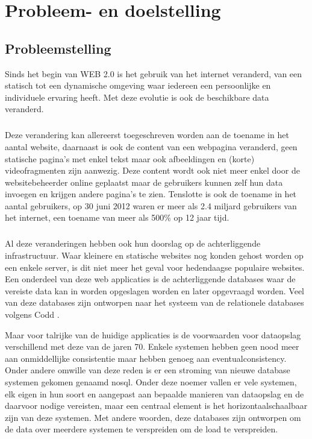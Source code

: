 \documentclass{book}
\begin{document}


\chapter{Probleem- en doelstelling}

\section{Probleemstelling}
Sinds het begin van WEB 2.0 is het gebruik van het internet veranderd, van een statisch tot een dynamische omgeving waar iedereen een persoonlijke en individuele ervaring heeft. Met deze evolutie is ook de beschikbare data veranderd.

\paragraph{}
Deze verandering kan allereerst toegeschreven worden aan de toename in het aantal website, daarnaast is ook de content van een webpagina veranderd, geen statische pagina's met enkel tekst maar ook afbeeldingen en (korte) videofragmenten zijn aanwezig. Deze content wordt ook niet meer enkel door de websitebeheerder online geplaatst maar de gebruikers kunnen zelf hun data invoegen en krijgen andere pagina's te zien. 
Tenslotte is ook de toename in het aantal gebruikers, op 30 juni 2012 waren er meer als 2.4 miljard gebruikers van het internet, een toename van meer als 500\% op 12 jaar tijd.  
\cite{WorldInternetStatics}

\paragraph{}
Al deze veranderingen hebben ook hun doorslag op de achterliggende infrastructuur. Waar kleinere en statische websites nog konden gehost worden op een enkele server, is dit niet meer het geval voor hedendaagse populaire websites. 
Een onderdeel van deze web applicaties is de achterliggende databases waar de vereiste data kan in worden opgeslagen worden en later opgevraagd worden. Veel van deze databases zijn ontworpen naar het systeem van de relationele databases volgens Codd \cite{Codd:1970:RMD:362384.362685}.

Maar voor talrijke van de huidige applicaties is de voorwaarden voor dataopslag verschillend met deze van de jaren 70. Enkele systemen hebben geen nood meer aan onmiddellijke consistentie maar hebben genoeg aan \gls{eventualconsistency}. Onder andere omwille van deze reden is er een stroming van nieuwe database systemen gekomen genaamd \gls{nosql}. Onder deze noemer vallen er vele systemen, elk eigen in hun soort en aangepast aan bepaalde manieren van dataopslag en de daarvoor nodige vereisten, maar een centraal element is het \gls{horizontaalschaalbaar} zijn van deze systemen. Met andere woorden, deze databases zijn ontworpen om de data over meerdere systemen te verspreiden om de load te verspreiden. 
\end{document}
